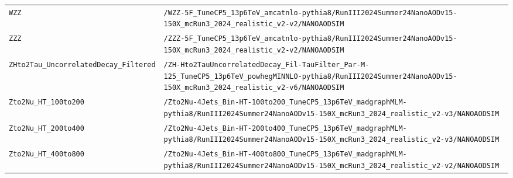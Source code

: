 \begin{longtable}{@{}>{\RaggedRight\arraybackslash}p{} >{\RaggedRight\arraybackslash}p{}@{}}
\addlinespace[2pt]
\texttt{WZZ} & \texttt{/\allowbreak{}WZZ-\allowbreak{}5F\_\allowbreak{}TuneCP5\_\allowbreak{}13p6TeV\_\allowbreak{}amcatnlo-\allowbreak{}pythia8/\allowbreak{}RunIII2024Summer24NanoAODv15-\allowbreak{}150X\_\allowbreak{}mcRun3\_\allowbreak{}2024\_\allowbreak{}realistic\_\allowbreak{}v2-\allowbreak{}v2/\allowbreak{}NANOAODSIM} \\
\addlinespace[2pt]
\texttt{ZZZ} & \texttt{/\allowbreak{}ZZZ-\allowbreak{}5F\_\allowbreak{}TuneCP5\_\allowbreak{}13p6TeV\_\allowbreak{}amcatnlo-\allowbreak{}pythia8/\allowbreak{}RunIII2024Summer24NanoAODv15-\allowbreak{}150X\_\allowbreak{}mcRun3\_\allowbreak{}2024\_\allowbreak{}realistic\_\allowbreak{}v2-\allowbreak{}v2/\allowbreak{}NANOAODSIM} \\
\addlinespace[2pt]
\texttt{ZHto2Tau\_\allowbreak{}UncorrelatedDecay\_\allowbreak{}Filtered} & \texttt{/\allowbreak{}ZH-\allowbreak{}Hto2TauUncorrelatedDecay\_\allowbreak{}Fil-\allowbreak{}TauFilter\_\allowbreak{}Par-\allowbreak{}M-\allowbreak{}125\_\allowbreak{}TuneCP5\_\allowbreak{}13p6TeV\_\allowbreak{}powhegMINNLO-\allowbreak{}pythia8/\allowbreak{}RunIII2024Summer24NanoAODv15-\allowbreak{}150X\_\allowbreak{}mcRun3\_\allowbreak{}2024\_\allowbreak{}realistic\_\allowbreak{}v2-\allowbreak{}v6/\allowbreak{}NANOAODSIM} \\
\addlinespace[2pt]
\texttt{Zto2Nu\_\allowbreak{}HT\_\allowbreak{}100to200} & \texttt{/\allowbreak{}Zto2Nu-\allowbreak{}4Jets\_\allowbreak{}Bin-\allowbreak{}HT-\allowbreak{}100to200\_\allowbreak{}TuneCP5\_\allowbreak{}13p6TeV\_\allowbreak{}madgraphMLM-\allowbreak{}pythia8/\allowbreak{}RunIII2024Summer24NanoAODv15-\allowbreak{}150X\_\allowbreak{}mcRun3\_\allowbreak{}2024\_\allowbreak{}realistic\_\allowbreak{}v2-\allowbreak{}v3/\allowbreak{}NANOAODSIM} \\
\addlinespace[2pt]
\texttt{Zto2Nu\_\allowbreak{}HT\_\allowbreak{}200to400} & \texttt{/\allowbreak{}Zto2Nu-\allowbreak{}4Jets\_\allowbreak{}Bin-\allowbreak{}HT-\allowbreak{}200to400\_\allowbreak{}TuneCP5\_\allowbreak{}13p6TeV\_\allowbreak{}madgraphMLM-\allowbreak{}pythia8/\allowbreak{}RunIII2024Summer24NanoAODv15-\allowbreak{}150X\_\allowbreak{}mcRun3\_\allowbreak{}2024\_\allowbreak{}realistic\_\allowbreak{}v2-\allowbreak{}v3/\allowbreak{}NANOAODSIM} \\
\addlinespace[2pt]
\texttt{Zto2Nu\_\allowbreak{}HT\_\allowbreak{}400to800} & \texttt{/\allowbreak{}Zto2Nu-\allowbreak{}4Jets\_\allowbreak{}Bin-\allowbreak{}HT-\allowbreak{}400to800\_\allowbreak{}TuneCP5\_\allowbreak{}13p6TeV\_\allowbreak{}madgraphMLM-\allowbreak{}pythia8/\allowbreak{}RunIII2024Summer24NanoAODv15-\allowbreak{}150X\_\allowbreak{}mcRun3\_\allowbreak{}2024\_\allowbreak{}realistic\_\allowbreak{}v2-\allowbreak{}v2/\allowbreak{}NANOAODSIM} \\

\end{longtable}
